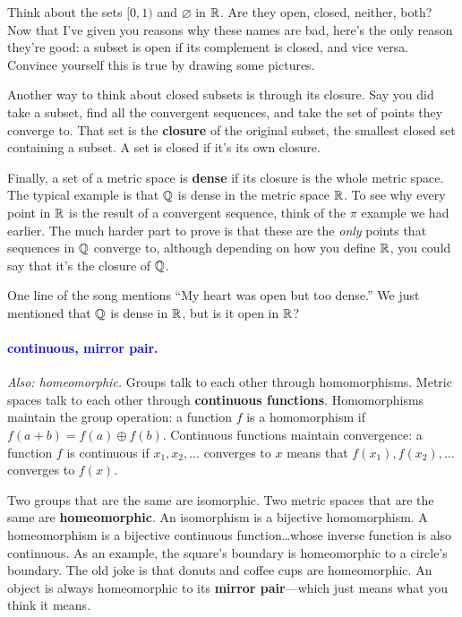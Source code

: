 \documentclass[11pt,paper=letter]{scrartcl}
\renewcommand{\bluebf}[1]{{\bfseries \color{Blue} #1}}
\renewcommand\wp[1]{\paragraph{\textcolor{Blue}{#1.}} \hspace{-1em}}
\newcommand\wl[1]{\label{w:#1}}
\newcommand\oww[1]{\textit{Also: #1.}}
\begin{document}
\begin{exrboxed}
  Think about the sets $[0, 1)$ and $ \varnothing $ in $\mathbb R$. Are they open, closed, neither, both? Now that I've given you reasons why these names are bad, here's the only reason they're good: a subset is open if its complement is closed, and vice versa. Convince yourself this is true by drawing some pictures.
\end{exrboxed}

Another way to think about closed subsets is through its closure. Say you did take a subset, find all the convergent sequences, and take the set of points they converge to. That set is the \textbf{closure} of the original subset, the smallest closed set containing a subset. A set is closed if it's its own closure.

Finally, a set of a metric space is \bluebf{dense} if its closure is the whole metric space. The typical example is that $\mathbb Q$ is dense in the metric space $\mathbb R$. To see why every point in $\mathbb R$ is the result of a convergent sequence, think of the $\pi$ example we had earlier. The much harder part to prove is that these are the \textit{only} points that sequences in $\mathbb Q$ converge to, although depending on how you define $\mathbb R$, you could say that it's the closure of $\mathbb Q$.

\begin{exrboxed}
  One line of the song mentions ``My heart was open but too dense.'' We just mentioned that $\mathbb Q$ is dense in $\mathbb R$, but is it open in $\mathbb R$?
\end{exrboxed}

\wp{continuous, mirror pair}
\wl{continuous}
\wl{mirror pair}
\oww{homeomorphic}
Groups talk to each other through homomorphisms. Metric spaces talk to each other through \textbf{continuous functions}. Homomorphisms maintain the group operation: a function $f$ is a homomorphism if $f(a + b) = f(a) \oplus f(b)$. Continuous functions maintain convergence: a function $f$ is continuous if $ x_1 , x_2 ,\ldots $ converges to $ x $ means that $f(x_1), f(x_2), \ldots$ converges to $f(x)$.

Two groups that are the same are isomorphic. Two metric spaces that are the same are \textbf{homeomorphic}. An isomorphism is a bijective homomorphism. A homeomorphism is a bijective continuous function\dots whose inverse function is also continuous. As an example, the square's boundary is homeomorphic to a circle's boundary. The old joke is that donuts and coffee cups are homeomorphic. An object is always homeomorphic to its \bluebf{mirror pair}---which just means what you think it means.
\end{document}
